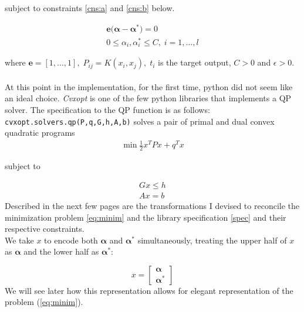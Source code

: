 \documentclass[12pt,twoside,notitlepage]{report}
\begin{document}
subject to constraints \ref{cns:a} and \ref{cns:b} below.

\begin{gather}
  \mathbf{e(\bm{\alpha}}-\bm{\alpha^*})=0 \label{cns:a}\\
  0\leq \alpha_i,\alpha_i^* \leq C, \;i=1,...,l \label{cns:b}
 \end{gather}

where
\(\mathbf{e}=[1,...,1],\;P_{ij}=K(x_i,x_j),\;t_i\) is the target output, \(C >
0\) and \(\epsilon > 0.\)
\paragraph*{}
At this point in the implementation, for the first time, python did not seem
like an ideal choice.  \textit{Cvxopt} is one of the few python libraries that
implements a QP solver. The specification to the QP function is as follows:
\texttt{cvxopt.solvers.qp(P,q,G,h,A,b)} solves a pair of primal and dual convex
quadratic programs
\begin{gather} \label{spec}
  \min \frac{1}{2} x^T P x + q^T x
\end{gather}

 subject to

\begin{gather}
 G x \leq h\\
  Ax = b
\end{gather}
Described in the next few pages are the transformations I devised to reconcile
the minimization problem \ref{eq:minim} and the library specification
\ref{spec} and their respective constraints.\\
We take \(x\) to encode both \(\bm{\alpha}\) and \(\bm{\alpha^*}\)
simultaneously, treating the upper half of \(x\) as \(\bm{\alpha}\) and the
lower half as \(\bm{\alpha^*}\):


\[x =
  \begin{bmatrix}
    \bm{ \alpha} \\
    \bm{ \alpha^*}
  \end{bmatrix}
\]
We will see later how this representation allows for elegant representation of
the problem (\ref{eq:minim}).
\end{document}
